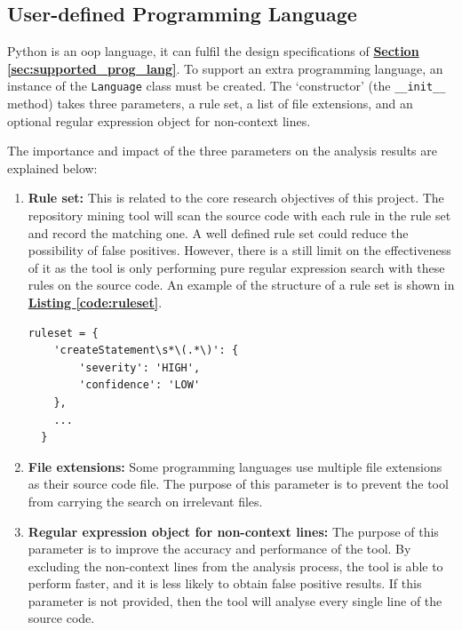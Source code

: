 \documentclass[12pt, a4paper]{report}
\begin{document}
\subsection{User-defined Programming Language}
Python is an \acrfull{oop} language, it can fulfil the design specifications of
\hyperref[sec:supported_prog_lang]{\textbf{Section \ref*{sec:supported_prog_lang}}}. To support an
extra programming language, an instance of the \texttt{Language} class must be created. The
`constructor' (the \texttt{\_\_init\_\_} method) takes three parameters, a rule set, a list of file
extensions, and an optional regular expression object for non-context lines.

The importance and impact of the three parameters on the analysis results are explained below:
\begin{enumerate}
  \item \textbf{Rule set:} This is related to the core research objectives of this project. The
  repository mining tool will scan the source code with each rule in the rule set and record the
  matching one. A well defined rule set could reduce the possibility of false positives. However,
  there is a still limit on the effectiveness of it as the tool is only performing pure regular
  expression search with these rules on the source code. An example of the structure of a rule set
  is shown in \hyperref[code:ruleset]{\textbf{Listing \ref*{code:ruleset}}}.
  \begin{lstlisting}[basicstyle=\ttfamily, label=code:ruleset,
    caption=An example snippet of the Java ruleset.]
  ruleset = {
    'createStatement\s*\(.*\)': {
        'severity': 'HIGH',
        'confidence': 'LOW'
    },
    ...
  }
  \end{lstlisting}
  \item \textbf{File extensions:} Some programming languages use multiple file extensions as their
  source code file. The purpose of this parameter is to prevent the tool from carrying the search on
  irrelevant files.
  \item \textbf{Regular expression object for non-context lines:} The purpose of this parameter is
  to improve the accuracy and performance of the tool. By excluding the non-context lines from the
  analysis process, the tool is able to perform faster, and it is less likely to obtain false
  positive results. If this parameter is not provided, then the tool will analyse every single line
  of the source code.
\end{enumerate}
\end{document}
